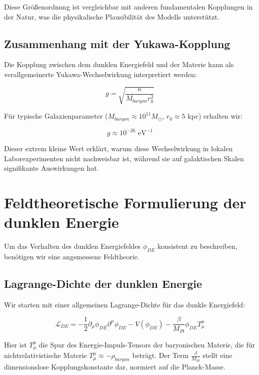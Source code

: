 \documentclass[a4paper,12pt]{article}
\begin{document}
	Diese Größenordnung ist vergleichbar mit anderen fundamentalen Kopplungen in der Natur, was die physikalische Plausibilität des Modells unterstützt.
	
	\subsection{Zusammenhang mit der Yukawa-Kopplung}
	
	Die Kopplung zwischen dem dunklen Energiefeld und der Materie kann als verallgemeinerte Yukawa-Wechselwirkung interpretiert werden:
	
	\begin{equation}
		g = \sqrt{\frac{\kappa}{M_{baryon} r_0^2}}
	\end{equation}
	
	Für typische Galaxienparameter ($M_{baryon} \approx 10^{11} M_{\odot}$, $r_0 \approx 5$ kpc) erhalten wir:
	
	\begin{equation}
		g \approx 10^{-26} \text{ eV}^{-1}
	\end{equation}
	
	Dieser extrem kleine Wert erklärt, warum diese Wechselwirkung in lokalen Laborexperimenten nicht nachweisbar ist, während sie auf galaktischen Skalen signifikante Auswirkungen hat.
	
	\section{Feldtheoretische Formulierung der dunklen Energie}
	
	Um das Verhalten des dunklen Energiefeldes $\phi_{DE}$ konsistent zu beschreiben, benötigen wir eine angemessene Feldtheorie. 
	
	\subsection{Lagrange-Dichte der dunklen Energie}
	
	Wir starten mit einer allgemeinen Lagrange-Dichte für das dunkle Energiefeld:
	
	\begin{equation}
		\mathcal{L}_{DE} = -\frac{1}{2}\partial_\mu \phi_{DE} \partial^\mu \phi_{DE} - V(\phi_{DE}) - \frac{\beta}{M_{Pl}} \phi_{DE} T^{\mu}_{\mu}
	\end{equation}
	
	Hier ist $T^{\mu}_{\mu}$ die Spur des Energie-Impuls-Tensors der baryonischen Materie, die für nichtrelativistische Materie $T^{\mu}_{\mu} \approx -\rho_{baryon}$ beträgt. Der Term $\frac{\beta}{M_{Pl}}$ stellt eine dimensionslose Kopplungskonstante dar, normiert auf die Planck-Masse.
	
\end{document}
